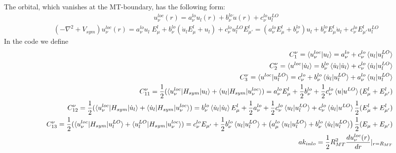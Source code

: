 \documentclass[aps,prb,floatfix,epsfig,singlecolumn,showpacs,preprintnumbers]{revtex4}
\begin{document}
The orbital, which vanishes at the MT-boundary, has the following
form:
\begin{eqnarray}
u^{loc}_\nu(r) = a^{lo}_\nu u_l(r) + b^{lo}_\nu \dot{u}(r) + c^{lo}_\nu u_l^{LO}
\end{eqnarray}
\begin{eqnarray}
(-\nabla^2+V_{sym}) u^{loc}_\nu(r) = 
 a^{lo}_\nu u_l \; E_{\mu} ^l
+  b^{lo}_\nu (\dot{u}_l  E_{\mu}^l + u_l) 
+ c^{lo}_\nu u^{LO}_l  E^l_{\mu'} 
= (a^{lo}_\nu E_{\mu}^l+b^{lo}_\nu) u_l + 
b^{lo}_\nu E_\mu^l \dot{u}_l + c^{lo}_\nu E_{\mu'}^l  u^{LO}_l
\end{eqnarray}
In the code we define
\begin{eqnarray}
&& C^\nu_1  = \braket{u^{loc}_\nu|u_l}    = a^{lo}_\nu + c^{lo}_\nu\braket{u_l|u_l^{LO}}\\
&& C^\nu_2  = \braket{u^{loc}|\dot{u}_l} = b^{lo}_\nu\braket{\dot{u}_l|\dot{u}_l} + c^{lo}_\nu\braket{\dot{u}_l|u^{LO}_l}\\
&& C^\nu_3  = \braket{u^{loc}|u^{LO}_l} = c_\nu^{lo} + b_\nu^{lo}\braket{\dot{u}_l|u^{LO}_l} + a^{lo}_\nu\braket{u_l|u^{LO}_l}\\
&& C^\nu_{11} = \frac{1}{2}(\braket{u^{loc}_\nu|H_{sym}|u_l}+\braket{u_l|H_{sym}|u^{loc}_\nu})
   = a^{lo}_\nu E_\mu^l + \frac{1}{2} b^{lo}_\nu + \frac{1}{2} c^{lo}_\nu \braket{u|u^{LO}}(E^l_\mu+E^l_{\mu'})\\
&& C^\nu_{12} =  \frac{1}{2}(\braket{u^{loc}_\nu|H_{sym}|\dot{u}_l}+\braket{\dot{u}_l|H_{sym}|u^{loc}_\nu}) 
= b^{lo}_\nu \braket{\dot{u}_l|\dot{u}_l}E^l_\mu + 
\frac{1}{2} a^{lo}_\nu+
\frac{1}{2}c^{lo}_\nu\braket{u_l|u_l^{LO}}+
c^{lo}_\nu\braket{\dot{u}_l|u^{LO}}\frac{1}{2}(E^l_\mu+E^l_{\mu'}) 
\\
&& C^\nu_{13} =  \frac{1}{2}(\braket{u^{loc}_\nu|H_{sym}|u^{LO}_l}+\braket{u^{LO}_l|H_{sym}|u^{loc}_\nu}) 
= c^{lo}_\nu E_{\mu'} + 
\frac{1}{2} b^{lo}_\nu \braket{u_l|u^{LO}_l} + 
\left(a^{lo}_\mu\braket{u_l|u^{LO}_l}+b^{lo}_\nu\braket{\dot{u}_l|u^{LO}_l}\right) \frac{1}{2}(E_\mu+E_{\mu'}) 
\nonumber\\
&& ak_{inlo} = \frac{1}{2}  R_{MT}^2  \frac{du_\nu^{loc}(r)}{dr}|_{r=R_{MT}}
\end{eqnarray}
\end{document}
